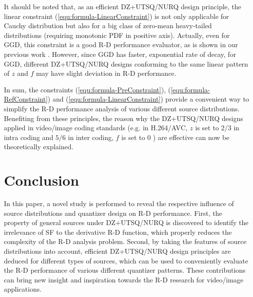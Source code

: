 \documentclass[smallabstract,smallcaptions]{dccpaper}
\begin{document}
It should be noted that, as an efficient DZ+UTSQ/NURQ design principle, the linear constraint (\ref{equ:formula-LinearConstraint}) is not only applicable for Cauchy distribution but also for a big class of zero-mean heavy-tailed distributions (requiring monotonic PDF in positive axis). Actually, even for GGD, this constraint is a good R-D performance evaluator, as is shown in our previous work \cite{Sun_TIP2013}. However, since GGD has faster, exponential rate of decay, for GGD, different DZ+UTSQ/NURQ designs conforming to the same linear pattern of $z$ and $f$ may have slight deviation in R-D performance. 

In sum, the constraints (\ref{equ:formula-PreConstraint}), (\ref{equ:formula-RefConstraint}) and (\ref{equ:formula-LinearConstraint}) provide a convenient way to simplify the R-D performance analysis of various different source distributions. Benefiting from these principles, the reason why the DZ+UTSQ/NURQ designs applied in video/image coding standards (e.g. in H.264/AVC, $z$ is set to $2/3$ in intra coding and $5/6$ in inter coding, $f$ is set to $0$ \cite{Sullivan_VCIP2005}) are effective can now be theoretically explained.

\section{Conclusion}
\label{sec:conclusion}

In this paper, a novel study is performed to reveal the respective influence of source distributions and quantizer design on R-D performance. First, the property of general sources under DZ+UTSQ/NURQ is discovered to identify the irrelevance of SF to the derivative R-D function, which properly reduces the complexity of the R-D analysis problem. Second, by taking the features of source distributions into account, efficient DZ+UTSQ/NURQ design principles are deduced for different types of sources, which can be used to conveniently evaluate the R-D performance of various different quantizer patterns. These contributions can bring new insight and inspiration towards the R-D research for video/image applications.

\end{document}
